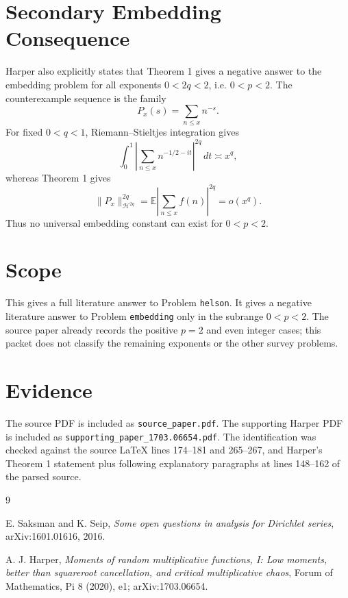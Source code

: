 \documentclass[11pt]{article}
\begin{document}
\section*{Secondary Embedding Consequence}

Harper also explicitly states that Theorem 1 gives a negative answer to the
embedding problem for all exponents \(0<2q<2\), i.e. \(0<p<2\). The
counterexample sequence is the family
\[
  P_x(s)=\sum_{n\le x} n^{-s}.
\]
For fixed \(0<q<1\), Riemann--Stieltjes integration gives
\[
  \int_0^1 \left|\sum_{n\le x} n^{-1/2-it}\right|^{2q}\,dt
  \asymp x^q,
\]
whereas Theorem 1 gives
\[
  \|P_x\|_{\mathcal H^{2q}}^{2q}
  =
  \mathbb E\left|\sum_{n\le x} f(n)\right|^{2q}
  =
  o(x^q).
\]
Thus no universal embedding constant can exist for \(0<p<2\).

\section*{Scope}

This gives a full literature answer to Problem \texttt{helson}. It gives a
negative literature answer to Problem \texttt{embedding} only in the subrange
\(0<p<2\). The source paper already records the positive \(p=2\) and even
integer cases; this packet does not classify the remaining exponents or the
other survey problems.

\section*{Evidence}

The source PDF is included as \texttt{source\_paper.pdf}. The supporting Harper
PDF is included as \texttt{supporting\_paper\_1703.06654.pdf}. The identification
was checked against the source LaTeX lines 174--181 and 265--267, and
Harper's Theorem 1 statement plus following explanatory paragraphs at lines
148--162 of the parsed source.

\begin{thebibliography}{9}

E. Saksman and K. Seip,
\emph{Some open questions in analysis for Dirichlet series},
arXiv:1601.01616, 2016.

A. J. Harper,
\emph{Moments of random multiplicative functions, I: Low moments, better than
squareroot cancellation, and critical multiplicative chaos},
Forum of Mathematics, Pi 8 (2020), e1; arXiv:1703.06654.

\end{thebibliography}
\end{document}
